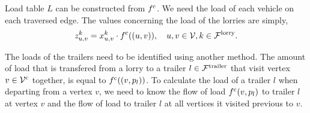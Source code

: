 Load table $L$ can be constructed from $f^{\rm c}$.
We need the load of each vehicle on each traversed edge. The values concerning the load of the lorries are simply,
\begin{align}
	\label{eq:lorry_load}
	z^{k}_{u,v} =
	x^k_{u,v} \cdot f^{\rm c}((u,v)) ,  \quad u,v \in \mathcal V,
   k \in \mathcal F^{\rm lorry}. \notag
\end{align}

The loads of the trailers need to be identified using another method.
The  amount of load that is transfered from a lorry to a trailer
 $l \in \mathcal F^{\rm trailer}$
 that visit vertex $v \in \mathcal V^{\rm c}$ together, is equal to
 $f^{\rm c}((v,p_l))$.
To calculate the load of a trailer $l$ when departing from a vertex $v$,
we need to know the flow of load $f^{\rm c}(v,p_l)$ to trailer $l$ at vertex $v$ and the flow of load to trailer $l$ at all vertices it visited previous to $v$.  \\

